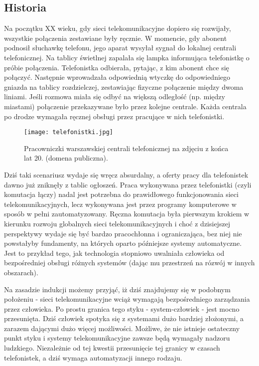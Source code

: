 \subsection{Historia}

Na początku XX wieku, gdy sieci telekomunikacyjne dopiero się rozwijały, wszystkie połączenia zestawiane były ręcznie. W momencie, gdy abonent podnosił słuchawkę telefonu, jego aparat wysyłał sygnał do lokalnej centrali telefonicznej. Na tablicy świetlnej zapalała się lampka informująca telefonistkę o próbie połączenia. Telefonistka odbierała, pytając, z kim abonent chce się połączyć. Następnie wprowadzała odpowiednią wtyczkę do odpowiedniego gniazda na tablicy rozdzielczej, zestawiając fizyczne połączenie między dwoma liniami. Jeśli rozmowa miała się odbyć na większą odległość (np. między miastami) połączenie przekazywane było przez kolejne centrale. Każda centrala po drodze wymagała ręcznej obsługi przez pracujące w nich telefonistki. 

\begin{figure}[!h]
    \centering \texttt{[image: telefonistki.jpg]}
    \caption{Pracowniczki warszawskiej centrali telefonicznej na zdjęciu z końca lat 20. (domena publiczna).}\label{fig:telefonistki}
\end{figure}

Dziś taki scenariusz wydaje się wręcz absurdalny, a oferty pracy dla telefonistek dawno już zniknęły z tablic ogłoszeń. Praca wykonywana przez telefonistki (czyli komutacja łączy) nadal jest potrzebna do prawidłowego funkcjonowania sieci telekomunikacyjnych, lecz wykonywana jest przez programy komputerowe w sposób w pełni zautomatyzowany. Ręczna komutacja była pierwszym krokiem w kierunku rozwoju globalnych sieci telekomunikacyjnych i choć z dzisiejszej perspektywy wydaje się być bardzo pracochłonna i ograniczająca, bez niej nie powstałyby fundamenty, na których oparto późniejsze systemy automatyczne. Jest to przykład tego, jak technologia stopniowo uwalniała człowieka od bezpośredniej obsługi różnych systemów (dając mu przestrzeń na rózwój w innych obszarach). 

Na zasadzie indukcji możemy przyjąć, iż dziś znajdujemy się w podobnym położeniu - sieci telekomunikacyjne wciąż wymagają bezpośredniego zarządzania przez człowieka. Po prostu granica tego styku - system-człowiek - jest mocno przesunięta. Dziś człowiek spotyka się z systemami dużo bardziej złożonymi, a zarazem dającymi dużo więcej możliwości. Możliwe, że nie istnieje ostateczny punkt styku i systemy telekomunikacyjne zawsze będą wymagały nadzoru ludzkiego. Niezależnie od tej kwestii przesunięcie tej granicy w czasach telefonistek, a dziś wymaga automatyzacji innego rodzaju. 

